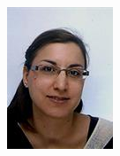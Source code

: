 \begin{minipage}{0.3\textwidth}\raggedright
	\includegraphics[width=\textwidth]{images/team/mtrentini}
\end{minipage}

